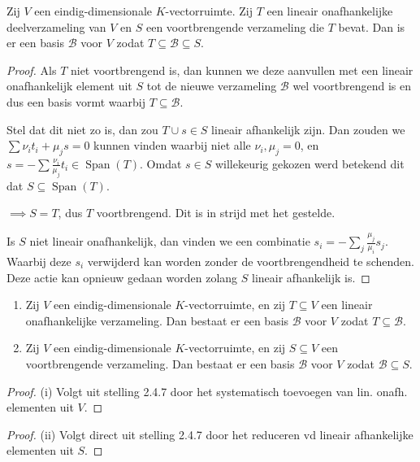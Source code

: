 \begin{stelling}[2.4.7]
    Zij $V$ een eindig-dimensionale $K$-vectorruimte. Zij $T$ een lineair onafhankelijke deelverzameling van $V$ en $S$ een voortbrengende verzameling die $T$ bevat. Dan is er een basis $\mathcal{B}$ voor $V$ zodat $T \subseteq \mathcal{B} \subseteq S$.
\end{stelling}
\begin{proof}
    Als \(T\) niet voortbrengend is, dan kunnen we deze aanvullen met een lineair onafhankelijk element uit \(S\)
    tot de nieuwe verzameling \(\mathcal{B}\) wel voortbrengend is en dus een basis vormt waarbij \(T \subseteq \mathcal{B}\).
    
    Stel dat dit niet zo is, dan zou \(T \cup s \in S\) lineair afhankelijk zijn. 
    Dan zouden we \(\sum \nu_i t_i + \mu_j s = 0\) kunnen vinden waarbij niet alle \(\nu_i, \mu_j = 0\),
    en \(s = -\sum \frac{\nu_i}{\mu_j} t_i \in \operatorname{Span}(T)\). 
    Omdat \(s \in S\) willekeurig gekozen werd betekend dit dat \(S \subseteq\operatorname{Span}(T)\).

    \(\implies S = T\), dus \(T\) voortbrengend. Dit is in strijd met het gestelde. 

    Is \(S\) niet lineair onafhankelijk,
    dan vinden we een combinatie \(s_i = -\sum_{j} \frac{\mu_j}{\mu_i}s_j\).
    Waarbij deze \(s_i\) verwijderd kan worden zonder de voortbrengendheid te schenden. 
    Deze actie kan opnieuw gedaan worden zolang \(S\) lineair afhankelijk is.
\end{proof}

\begin{gevolg}[2.4.8]
    \begin{enumerate}
        \item[(i)] Zij $V$ een eindig-dimensionale $K$-vectorruimte, en zij $T \subseteq V$ een lineair onafhankelijke verzameling. Dan bestaat er een basis $\mathcal{B}$ voor $V$ zodat $T \subseteq \mathcal{B}$.
        \item[(ii)] Zij $V$ een eindig-dimensionale $K$-vectorruimte, en zij $S \subseteq V$ een voortbrengende verzameling. Dan bestaat er een basis $\mathcal{B}$ voor $V$ zodat $\mathcal{B} \subseteq S$.
    \end{enumerate}
\end{gevolg}
\begin{proof}(i)
    Volgt uit stelling 2.4.7 door het systematisch toevoegen van lin. onafh. elementen uit \(V\).
\end{proof}
\begin{proof}(ii)
    Volgt direct uit stelling 2.4.7 door het reduceren vd lineair afhankelijke elementen uit \(S\).
\end{proof}

